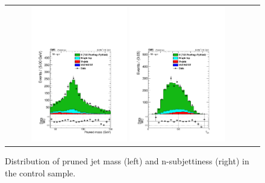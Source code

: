 \begin{figure}[ht!]
\centering
\begin{tabular}{cc}
\includegraphics[width=0.4\textwidth]{figures/vtagging/AN-16-215/Whadr_pruned_mu.pdf}
\includegraphics[width=0.4\textwidth]{figures/vtagging/AN-16-215/Whadr_tau21_mu.pdf}\\
\end{tabular}
\caption{Distribution of pruned jet mass (left) and n-subjettiness (right) in the \ttbar control sample.} 
\label{fig:searchI:ttbarcp}
\end{figure}

